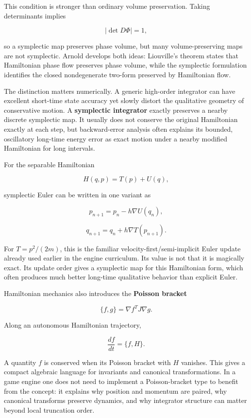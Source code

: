 This condition is stronger than ordinary volume preservation. Taking determinants implies

\[
|\det D\Phi|=1,
\]

so a symplectic map preserves phase volume, but many volume-preserving maps are not symplectic. Arnold develops both ideas: Liouville's theorem states that Hamiltonian phase flow preserves phase volume, while the symplectic formulation identifies the closed nondegenerate two-form preserved by Hamiltonian flow.

The distinction matters numerically. A generic high-order integrator can have excellent short-time state accuracy yet slowly distort the qualitative geometry of conservative motion. A \textbf{symplectic integrator} exactly preserves a nearby discrete symplectic map. It usually does not conserve the original Hamiltonian exactly at each step, but backward-error analysis often explains its bounded, oscillatory long-time energy error as exact motion under a nearby modified Hamiltonian for long intervals.

For the separable Hamiltonian

\[
H(q,p)=T(p)+U(q),
\]

symplectic Euler can be written in one variant as

\[
p_{n+1}
=
p_n-h\nabla U(q_n),
\]

\[
q_{n+1}
=
q_n+h\nabla T(p_{n+1}).
\]

For \(T=p^2/(2m)\), this is the familiar velocity-first/semi-implicit Euler update already used earlier in the engine curriculum. Its value is not that it is magically exact. Its update order gives a symplectic map for this Hamiltonian form, which often produces much better long-time qualitative behavior than explicit Euler.

Hamiltonian mechanics also introduces the \textbf{Poisson bracket}

\[
\{f,g\}
=
\nabla f^T J\nabla g.
\]

Along an autonomous Hamiltonian trajectory,

\[
\frac{df}{dt}
=
\{f,H\}.
\]

A quantity \(f\) is conserved when its Poisson bracket with \(H\) vanishes. This gives a compact algebraic language for invariants and canonical transformations. In a game engine one does not need to implement a Poisson-bracket type to benefit from the concept: it explains why position and momentum are paired, why canonical transforms preserve dynamics, and why integrator structure can matter beyond local truncation order.

